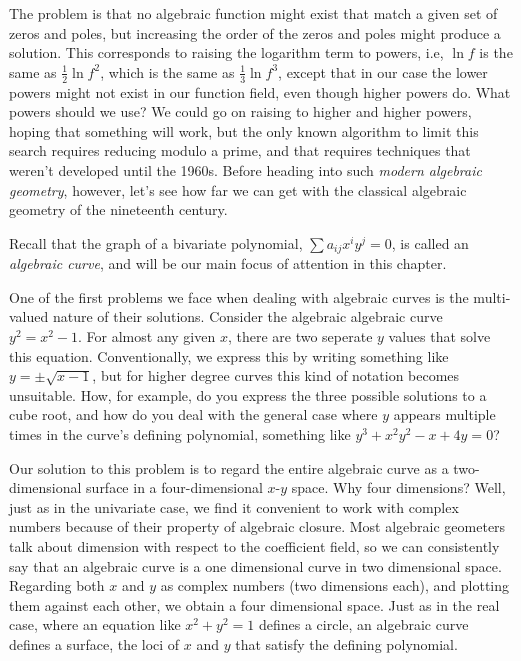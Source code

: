 The problem is that no algebraic function might exist that match a
given set of zeros and poles, but increasing the order of the zeros
and poles might produce a solution.  This corresponds to raising the
logarithm term to powers, i.e, $\ln f$ is the same as $\frac{1}{2} \ln
f^2$, which is the same as $\frac{1}{3} \ln f^3$, except that in our
case the lower powers might not exist in our function field, even
though higher powers do.  What powers should we use?  We could go on
raising to higher and higher powers, hoping that something will work,
but the only known algorithm to limit this search requires reducing
modulo a prime, and that requires techniques that weren't developed
until the 1960s.  Before heading into such {\it modern algebraic
geometry}, however, let's see how far we can get with the classical
algebraic geometry of the nineteenth century.


Recall that the graph of a bivariate polynomial, $\sum a_{ij} x^i y^j = 0$, is called an {\it algebraic curve},
and will be our main focus of attention in this chapter.


One of the first problems we face when dealing with algebraic curves
is the multi-valued nature of their solutions.  Consider the algebraic
algebraic curve $y^2 = x^2 - 1$.  For almost any given $x$,
there are two seperate $y$ values that solve this equation.
Conventionally, we
express this by writing something like $y = \pm\sqrt{x-1}$, but for
higher degree curves this kind of notation becomes unsuitable.  How,
for example, do you express the three possible solutions to a cube
root, and how do you deal with the general case where $y$ appears
multiple times in the curve's defining polynomial, something
like $y^3 + x^2y^2 - x + 4y=0$?


Our solution to this problem is to regard the entire algebraic curve
as a two-dimensional surface in a four-dimensional $x$-$y$ space.  Why four
dimensions?  Well, just as in the univariate case, we find it
convenient to work with complex numbers because of their property
of algebraic closure.
Most algebraic geometers talk about
dimension with respect to the coefficient field, so we can
consistently say that an algebraic curve is a one dimensional
curve in two dimensional space.
Regarding both $x$ and $y$ as complex
numbers (two dimensions each), and plotting them against each other,
we obtain a four dimensional space.  Just as in the real case, where
an equation like $x^2 + y^2 = 1$ defines a circle, an algebraic curve
defines a surface, the loci of $x$ and $y$ that satisfy the defining
polynomial.


